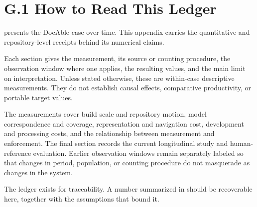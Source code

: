 


\section{G.1 How to Read This Ledger}\label{heading:g.1-how-to-read-this-ledger}

 presents the DocAble case over time. This appendix carries the quantitative and repository-level receipts behind its numerical claims.

Each section gives the measurement, its source or counting procedure, the observation window where one applies, the resulting values, and the main limit on interpretation. Unless stated otherwise, these are within-case descriptive measurements. They do not establish causal effects, comparative productivity, or portable target values.

The measurements cover build scale and repository motion, model correspondence and coverage, representation and navigation cost, development and processing costs, and the relationship between measurement and enforcement. The final section records the current longitudinal study and human-reference evaluation. Earlier observation windows remain separately labeled so that changes in period, population, or counting procedure do not masquerade as changes in the system.

The ledger exists for traceability. A number summarized in  should be recoverable here, together with the assumptions that bound it.
